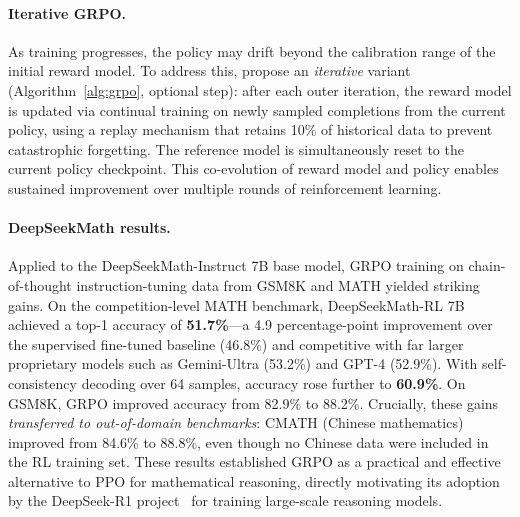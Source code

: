 \paragraph{Iterative GRPO.}
As training progresses, the policy may drift beyond the calibration range
of the initial reward model.  To address this, \cite{shao2024deepseekmath}
propose an \emph{iterative} variant (Algorithm~\ref{alg:grpo}, optional
step): after each outer iteration, the reward model is updated via
continual training on newly sampled completions from the current policy,
using a replay mechanism that retains 10\% of historical data to prevent
catastrophic forgetting.  The reference model is simultaneously reset to
the current policy checkpoint.  This co-evolution of reward model and
policy enables sustained improvement over multiple rounds of
reinforcement learning.

\paragraph{DeepSeekMath results.}
Applied to the DeepSeekMath-Instruct 7B base model, GRPO training on
chain-of-thought instruction-tuning data from GSM8K and MATH yielded
striking gains.  On the competition-level MATH benchmark,
DeepSeekMath-RL 7B achieved a top-1 accuracy of \textbf{51.7\%}---a
4.9 percentage-point improvement over the supervised fine-tuned
baseline (46.8\%) and competitive with far larger proprietary models
such as Gemini-Ultra (53.2\%) and GPT-4 (52.9\%).  With
self-consistency decoding over 64 samples, accuracy rose further to
\textbf{60.9\%}.  On GSM8K, GRPO improved accuracy from 82.9\% to
88.2\%.  Crucially, these gains \emph{transferred to out-of-domain
benchmarks}: CMATH (Chinese mathematics) improved from 84.6\% to
88.8\%, even though no Chinese data were included in the RL training
set.  These results established GRPO as a practical and effective
alternative to PPO for mathematical reasoning, directly motivating
its adoption by the DeepSeek-R1 project~\cite{deepseek2025r1} for
training large-scale reasoning models.

